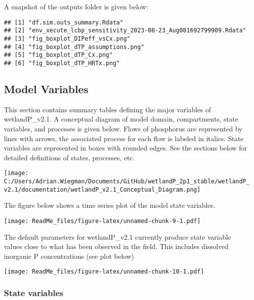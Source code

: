 \documentclass[
]{article}
\begin{document}
A snapshot of the outputs folder is given below:

\begin{verbatim}
## [1] "df.sim.outs_summary.Rdata"                                   
## [2] "env_xecute_lcbp_sensitivity_2023-08-23_Aug081692799909.Rdata"
## [3] "fig_boxplot_DIPeff_vsCx.png"                                 
## [4] "fig_boxplot_dTP_assumptions.png"                             
## [5] "fig_boxplot_dTP_Cx.png"                                      
## [6] "fig_boxplot_dTP_HRTx.png"
\end{verbatim}

\hypertarget{model-variables}{%
\subsection{Model Variables}\label{model-variables}}

This section contains summary tables defining the major variables of
wetlandP\_v2.1. A conceptual diagram of model domain, compartments,
state variables, and processes is given below. Flows of phosphorus are
represented by lines with arrows, the associated process for each flow
is labeled in italics. State variables are represented in boxes with
rounded edges. See the sections below for detailed definitions of
states, processes, etc.

\texttt{[image: C:/Users/Adrian.Wiegman/Documents/GitHub/wetlandP\_2p1\_stable/wetlandP\_v2.1/documentation/wetlandP\_v2.1\_Conceptual\_Diagram.png]}

The figure below shows a time series plot of the model state variables.

\texttt{[image: ReadMe\_files/figure-latex/unnamed-chunk-9-1.pdf]}

The default parameters for wetlandP\_v2.1 currently produce state
variable values close to what has been observed in the field. This
includes dissolved inorganic P concentrations (see plot below)

\texttt{[image: ReadMe\_files/figure-latex/unnamed-chunk-10-1.pdf]}

\hypertarget{state-variables}{%
\subsubsection{State variables}\label{state-variables}}
\end{document}
